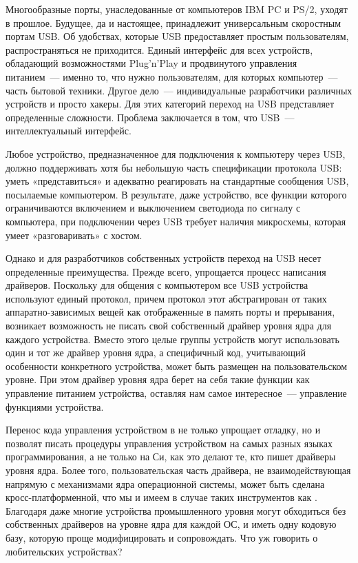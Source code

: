 \secdown

Многообразные порты, унаследованные от компьютеров IBM PC и PS/2, уходят в
прошлое. Будущее, да и настоящее, принадлежит универсальным скоростным портам
USB. Об удобствах, которые USB предоставляет простым пользователям,
распространяться не приходится. Единый интерфейс для всех устройств, обладающий
возможностями Plug’n’Play и продвинутого управления питанием\ --- именно то, что
нужно пользователям, для которых компьютер\ --- часть бытовой техники.
Другое дело\ --- индивидуальные разработчики различных устройств и просто
хакеры. Для этих категорий переход на USB представляет определенные сложности.
Проблема заключается в том, что USB\ --- интеллектуальный интерфейс.

Любое устройство, предназначенное для подключения к компьютеру через USB, должно
поддерживать хотя бы небольшую часть спецификации протокола USB: уметь
«представиться» и
адекватно реагировать на стандартные сообщения USB, посылаемые компьютером. В
результате, даже устройство, все функции которого ограничиваются включением и
выключением светодиода по сигналу с компьютера, при подключении через USB
требует наличия микросхемы, которая умеет «разговаривать» с хостом.

Однако и для
разработчиков собственных устройств переход на USB несет определенные
преимущества. Прежде всего, упрощается процесс написания драйверов. Поскольку
для общения с компьютером все USB устройства используют единый протокол, причем
протокол этот абстрагирован от таких аппаратно-зависимых вещей как отображенные
в память порты и прерывания, возникает возможность не писать свой собственный
драйвер уровня ядра для каждого устройства. Вместо этого целые группы устройств
могут использовать один и тот же драйвер уровня ядра, а специфичный код,
учитывающий особенности конкретного устройства, может быть размещен на
пользовательском уровне. При этом драйвер уровня ядра берет на себя такие
функции как управление питанием устройства, оставляя нам самое интересное\ --- управление
функциями устройства.

Перенос кода управления устройством в  не только упрощает
отладку, но и позволят писать процедуры управления устройством на самых разных
языках программирования, а не только на Си, как это делают те, кто пишет
драйверы уровня ядра. Более того, пользовательская часть драйвера, не
взаимодействующая напрямую с механизмами ядра операционной системы, может быть
сделана кросс-платформенной, что мы и имеем в случае таких инструментов как
. Благодаря  даже многие устройства промышленного
уровня могут обходиться без собственных драйверов на уровне ядра для каждой ОС,
и иметь одну кодовую базу, которую проще модифицировать и сопровождать.
Что уж говорить о любительских устройствах?





\secup

